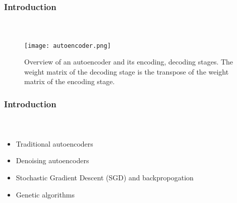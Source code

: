 
\begin{frame}[t]
	\frametitle{Introduction}
	\framesubtitle{~~}  %

\begin{figure}[h]
	\centering
	\texttt{[image: autoencoder.png]}
	\caption{Overview of an autoencoder and its encoding, decoding stages. The weight matrix of the decoding stage is the transpose of the weight matrix of the encoding stage.}
	\label{fig:autoencoder}
\end{figure}


\end{frame}


\begin{frame}[t]
	\frametitle{Introduction}
	\framesubtitle{~~}  %
	\begin{itemize}
		\item Traditional autoencoders
		\item Denoising autoencoders
		\item Stochastic Gradient Descent (SGD) and backpropogation
		\item Genetic algorithms
	\end{itemize}


\end{frame}

